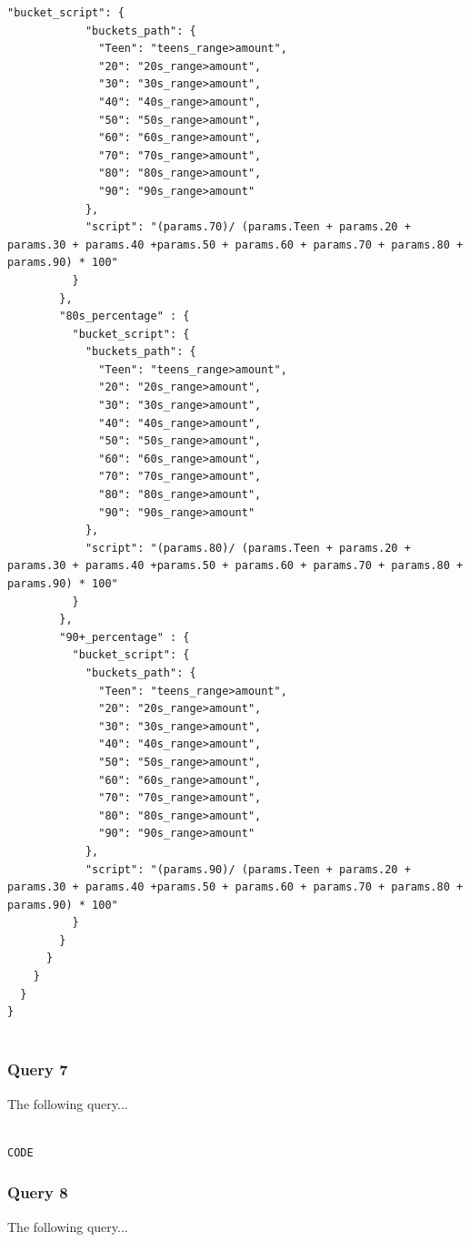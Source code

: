 \documentclass{article}
\begin{document}
\begin{lstlisting}[language=cypher, label=lst:cypher-example]
          "bucket_script": {
            "buckets_path": {
              "Teen": "teens_range>amount",
              "20": "20s_range>amount",
              "30": "30s_range>amount",
              "40": "40s_range>amount",
              "50": "50s_range>amount",
              "60": "60s_range>amount",
              "70": "70s_range>amount",
              "80": "80s_range>amount",
              "90": "90s_range>amount"
            },
            "script": "(params.70)/ (params.Teen + params.20 + params.30 + params.40 +params.50 + params.60 + params.70 + params.80 + params.90) * 100"
          }
        },
        "80s_percentage" : {
          "bucket_script": {
            "buckets_path": {
              "Teen": "teens_range>amount",
              "20": "20s_range>amount",
              "30": "30s_range>amount",
              "40": "40s_range>amount",
              "50": "50s_range>amount",
              "60": "60s_range>amount",
              "70": "70s_range>amount",
              "80": "80s_range>amount",
              "90": "90s_range>amount"
            },
            "script": "(params.80)/ (params.Teen + params.20 + params.30 + params.40 +params.50 + params.60 + params.70 + params.80 + params.90) * 100"
          }
        },
        "90+_percentage" : {
          "bucket_script": {
            "buckets_path": {
              "Teen": "teens_range>amount",
              "20": "20s_range>amount",
              "30": "30s_range>amount",
              "40": "40s_range>amount",
              "50": "50s_range>amount",
              "60": "60s_range>amount",
              "70": "70s_range>amount",
              "80": "80s_range>amount",
              "90": "90s_range>amount"
            },
            "script": "(params.90)/ (params.Teen + params.20 + params.30 + params.40 +params.50 + params.60 + params.70 + params.80 + params.90) * 100"
          }
        }
      }
    }
  }
}


\end{lstlisting}
\subsubsection{Query 7}
The following query...

\begin{lstlisting}[language=cypher, label=lst:cypher-example]

CODE

\end{lstlisting}
\subsubsection{Query 8}
The following query...
\end{document}
